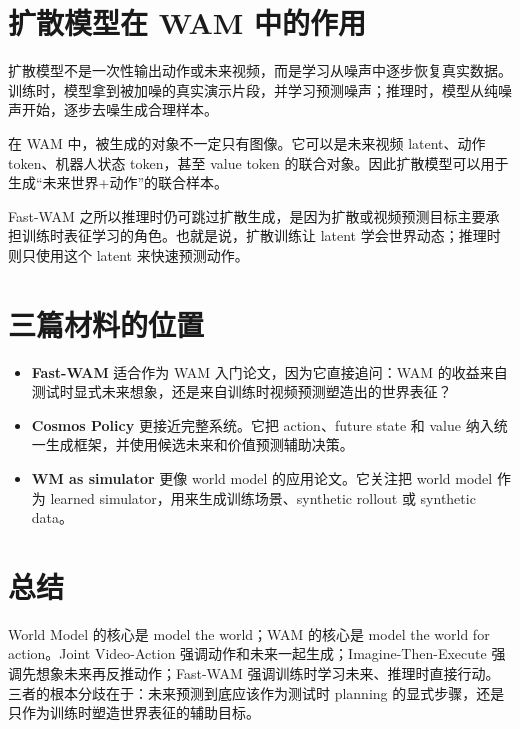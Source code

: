 \documentclass[11pt,a4paper]{ctexart}
\begin{document}
\section{扩散模型在 WAM 中的作用}

扩散模型不是一次性输出动作或未来视频，而是学习从噪声中逐步恢复真实数据。训练时，模型拿到被加噪的真实演示片段，并学习预测噪声；推理时，模型从纯噪声开始，逐步去噪生成合理样本。

在 WAM 中，被生成的对象不一定只有图像。它可以是未来视频 latent、动作 token、机器人状态 token，甚至 value token 的联合对象。因此扩散模型可以用于生成“未来世界+动作”的联合样本。

Fast-WAM 之所以推理时仍可跳过扩散生成，是因为扩散或视频预测目标主要承担训练时表征学习的角色。也就是说，扩散训练让 latent 学会世界动态；推理时则只使用这个 latent 来快速预测动作。

\section{三篇材料的位置}

\begin{itemize}
  \item \textbf{Fast-WAM} 适合作为 WAM 入门论文，因为它直接追问：WAM 的收益来自测试时显式未来想象，还是来自训练时视频预测塑造出的世界表征？
  \item \textbf{Cosmos Policy} 更接近完整系统。它把 action、future state 和 value 纳入统一生成框架，并使用候选未来和价值预测辅助决策。
  \item \textbf{WM as simulator} 更像 world model 的应用论文。它关注把 world model 作为 learned simulator，用来生成训练场景、synthetic rollout 或 synthetic data。
\end{itemize}

\section{总结}

World Model 的核心是 model the world；WAM 的核心是 model the world for action。Joint Video-Action 强调动作和未来一起生成；Imagine-Then-Execute 强调先想象未来再反推动作；Fast-WAM 强调训练时学习未来、推理时直接行动。三者的根本分歧在于：未来预测到底应该作为测试时 planning 的显式步骤，还是只作为训练时塑造世界表征的辅助目标。
\end{document}
